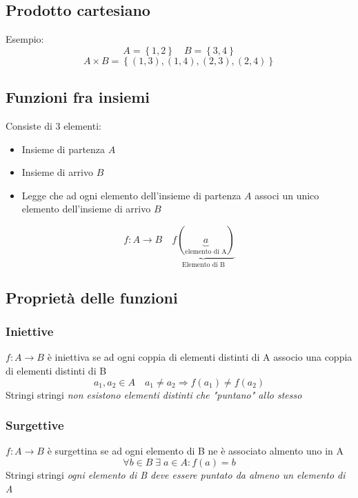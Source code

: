\subsection{Prodotto cartesiano}
\label{sec:prodottocartesiano}
Esempio:
\[
	A = \left\{ 1,2 \right\} \quad B= \left\{ 3,4 \right\}
\]
\[
	A \times B = \left\{ \left( 1,3 \right) , \left( 1,4 \right) , \left( 2,3 \right) , \left( 2,4 \right)  \right\}
\]


\subsection{Funzioni fra insiemi}
\label{sec:funzionifrainsiemi}
Consiste di 3 elementi:
\begin{itemize}
	\item Insieme di partenza $A$
	\item Insieme di arrivo $B$
	\item Legge che ad ogni elemento dell'insieme di partenza $A$ associ un unico elemento dell'insieme di arrivo $B$
\end{itemize}
\[
	f: A \rightarrow B \quad \underbrace{f\left( \underbrace{a}_{\text{elemento di A}}\right)}_{\text{Elemento di B}}
\]
\subsection{Proprietà delle funzioni}
\label{sec:proprietàdellefunzioni}
\subsubsection{Iniettive}
\label{sub:iniettive}
$f: A \rightarrow B$ è iniettiva se ad ogni coppia di elementi distinti di A associo una coppia di elementi distinti di B
\[
	a_1, a_2 \in A \quad a_1 \neq a_2 \Rightarrow f\left( a_1 \right) \neq f\left( a_2 \right)
\]
Stringi stringi \textit{non esistono elementi distinti che "puntano" allo stesso}
\subsubsection{Surgettive}
\label{sub:surgettine}
$f: A \rightarrow B$ è surgettina se ad ogni elemento di B ne è associato almento uno in A
\[
	\forall b \in B \; \exists \; a \in A : f\left( a \right) = b
\]
Stringi stringi \textit{ogni elemento di B deve essere puntato da almeno un elemento di A}
